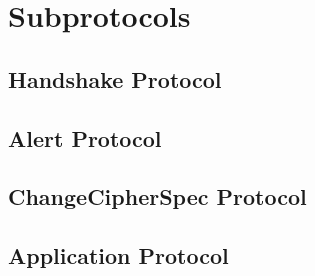 \section{Subprotocols}

\subsection{Handshake Protocol}

\subsection{Alert Protocol}

\subsection{ChangeCipherSpec Protocol}

\subsection{Application Protocol}

